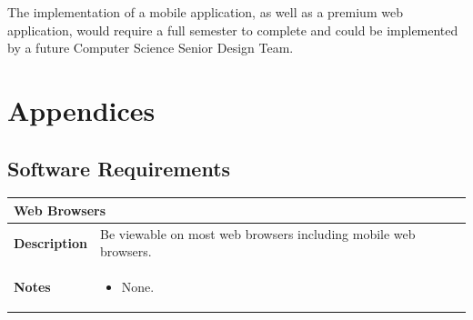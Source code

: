\documentclass[12pt,english]{article}
\providecommand{\tabularnewline}{\\}
\begin{document}
The implementation of a mobile application, as well as a premium web
application, would require a full semester to complete and could be
implemented by a future Computer Science Senior Design Team.
\clearpage

\section{Appendices}
\subsection{Software Requirements}
\begin{tabular}{|p{3cm}|p{13cm}|}
	\hline 
	\multicolumn{2}{|l|}{\textbf{Web Browsers}}\tabularnewline
	\hline 
	\textbf{Description}  & Be viewable on most web browsers including mobile web browsers. \tabularnewline
	\hline 
	\textbf{Notes}  & 
		\begin{itemize}
			\item None.
		\end{itemize}
	\tabularnewline
	\hline 
\end{tabular}\\[0.5cm]
\end{document}

